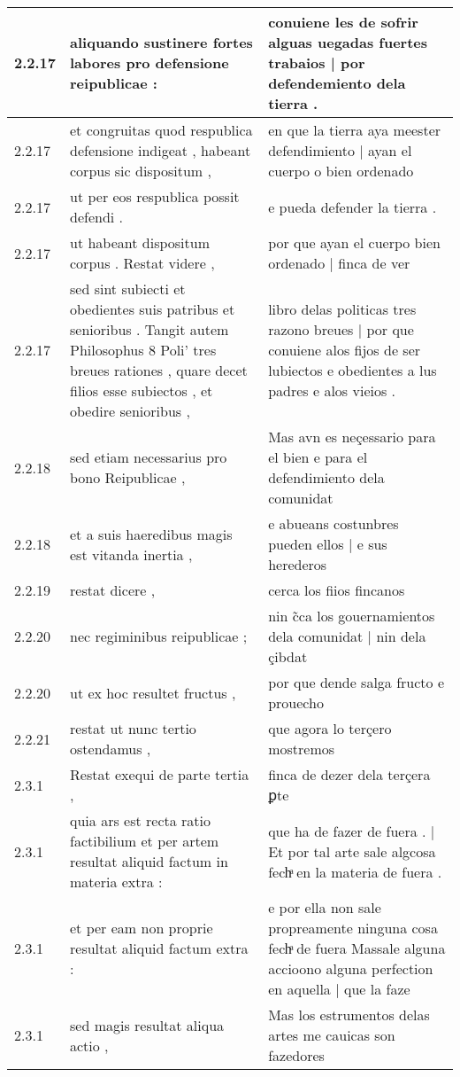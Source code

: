 \begin{tabular}{|p{1cm}|p{6.5cm}|p{6.5cm}|}
2.2.17 & aliquando sustinere fortes labores pro defensione reipublicae : & conuiene les de sofrir alguas uegadas fuertes trabaios | por defendemiento dela tierra . \\\hline
2.2.17 & et congruitas quod respublica defensione indigeat , habeant corpus sic dispositum , & en que la tierra aya meester defendimiento | ayan el cuerpo o bien ordenado \\\hline
2.2.17 & ut per eos respublica possit defendi . & e pueda defender la tierra . \\\hline
2.2.17 & ut habeant dispositum corpus . Restat videre , & por que ayan el cuerpo bien ordenado | finca de ver \\\hline
2.2.17 & sed sint subiecti et obedientes suis patribus et senioribus . Tangit autem Philosophus 8 Poli’ tres breues rationes , quare decet filios esse subiectos , et obedire senioribus , & libro delas politicas tres razono breues | por que conuiene alos fijos de ser lubiectos e obedientes a lus padres e alos vieios . \\\hline
2.2.18 & sed etiam necessarius pro bono Reipublicae , & Mas avn es neçessario para el bien e para el defendimiento dela comunidat \\\hline
2.2.18 & et a suis haeredibus magis est vitanda inertia , & e abueans costunbres pueden ellos | e sus herederos \\\hline
2.2.19 & restat dicere , & cerca los fiios fincanos \\\hline
2.2.20 & nec regiminibus reipublicae ; & nin c̃ca los gouernamientos dela comunidat | nin dela çibdat \\\hline
2.2.20 & ut ex hoc resultet fructus , & por que dende salga fructo e prouecho \\\hline
2.2.21 & restat ut nunc tertio ostendamus , & que agora lo terçero mostremos \\\hline
2.3.1 & Restat exequi de parte tertia , & finca de dezer dela terçera ꝑte \\\hline
2.3.1 & quia ars est recta ratio factibilium et per artem resultat aliquid factum in materia extra : & que ha de fazer de fuera . | Et por tal arte sale algcosa fechͣ en la materia de fuera . \\\hline
2.3.1 & et per eam non proprie resultat aliquid factum extra : & e por ella non sale propreamente ninguna cosa fechͣ de fuera Massale alguna accioono alguna perfection en aquella | que la faze \\\hline
2.3.1 & sed magis resultat aliqua actio , & Mas los estrumentos delas artes me cauicas son fazedores \\\hline

\end{tabular}
